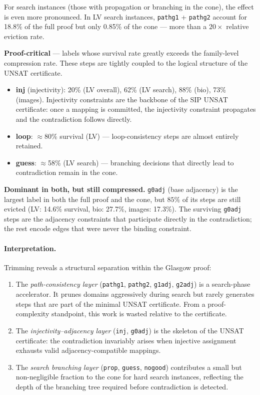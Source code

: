 \documentclass[11pt,a4paper]{article}
\begin{document}
For search instances (those with propagation or branching in the cone), the effect is even more
pronounced.
In LV search instances, \texttt{pathg1} + \texttt{pathg2} account for 18.8\% of the full proof
but only 0.85\% of the cone --- more than a $20{\times}$ relative eviction rate.

\textbf{Proof-critical} --- labels whose survival rate greatly exceeds the family-level
compression rate.
These steps are tightly coupled to the logical structure of the UNSAT certificate.

\begin{itemize}
  \item \textbf{inj} (injectivity): 20\% (LV overall), 62\% (LV search), 88\% (bio), 73\%
    (images).
    Injectivity constraints are the backbone of the SIP UNSAT certificate: once a mapping is
    committed, the injectivity constraint propagates and the contradiction follows directly.
  \item \textbf{loop}: $\approx$80\% survival (LV) --- loop-consistency steps are almost entirely
    retained.
  \item \textbf{guess}: $\approx$58\% (LV search) --- branching decisions that directly lead to
    contradiction remain in the cone.
\end{itemize}

\textbf{Dominant in both, but still compressed.}
\texttt{g0adj} (base adjacency) is the largest label in both the full proof and the cone, but
$85\%$ of its steps are still evicted (LV: 14.6\% survival, bio: 27.7\%, images: 17.3\%).
The surviving \texttt{g0adj} steps are the adjacency constraints that participate directly in
the contradiction; the rest encode edges that were never the binding constraint.

\paragraph{Interpretation.}
Trimming reveals a structural separation within the Glasgow proof:
\begin{enumerate}
  \item The \emph{path-consistency layer} (\texttt{pathg1}, \texttt{pathg2}, \texttt{g1adj},
    \texttt{g2adj}) is a search-phase accelerator.
    It prunes domains aggressively during search but rarely generates steps that are part of the
    minimal UNSAT certificate.
    From a proof-complexity standpoint, this work is wasted relative to the certificate.
  \item The \emph{injectivity--adjacency layer} (\texttt{inj}, \texttt{g0adj}) is the skeleton
    of the UNSAT certificate: the contradiction invariably arises when injective assignment
    exhausts valid adjacency-compatible mappings.
  \item The \emph{search branching layer} (\texttt{prop}, \texttt{guess}, \texttt{nogood})
    contributes a small but non-negligible fraction to the cone for hard search instances,
    reflecting the depth of the branching tree required before contradiction is detected.
\end{enumerate}
\end{document}
